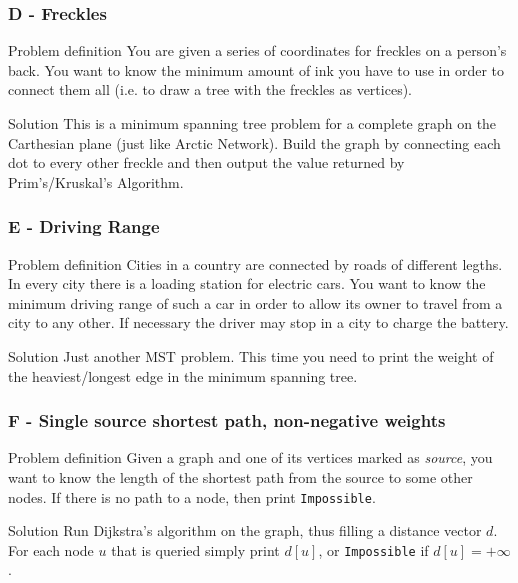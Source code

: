 \documentclass{beamer}
\begin{document}
\begin{frame}
  \frametitle{D - Freckles}
  \begin{block}{Problem definition}
    You are given a series of coordinates for freckles on a person's back. You want to know the minimum
    amount of ink you have to use in order to connect them all (i.e. to draw a tree with the freckles as vertices).
  \end{block}
  \pause
  \begin{block}{Solution}
    This is a minimum spanning tree problem for a complete graph on the Carthesian plane (just like Arctic Network).
    Build the graph by connecting each dot to every other freckle and then output the value returned by
    Prim's/Kruskal's Algorithm.
  \end{block}
\end{frame}

\begin{frame}
  \frametitle{E - Driving Range}
  \begin{block}{Problem definition}
    Cities in a country are connected by roads of different legths. In every city there is a loading
    station for electric cars. You want to know the minimum driving range of such a car in order to 
    allow its owner to travel from a city to any other. If necessary the driver may stop in a city to 
    charge the battery.
  \end{block}
  \pause
  \begin{block}{Solution}
    Just another MST problem. This time you need to print the weight of the heaviest/longest edge
    in the minimum spanning tree.
  \end{block}
\end{frame}

\begin{frame}
  \frametitle{F - Single source shortest path, non-negative weights}
  \begin{block}{Problem definition}
    Given a graph and one of its vertices marked as \textit{source}, you want to know the length of
    the shortest path from the source to some other nodes. If there is no path to a node, then print
    \texttt{Impossible}.  
  \end{block}
  \pause
  \begin{block}{Solution}
    Run Dijkstra's algorithm on the graph, thus filling a distance vector $d$. For each node $u$ that
    is queried simply print $d[u]$, or \texttt{Impossible} if $d[u]=+\infty$.  
  \end{block}
\end{frame}
\end{document}
